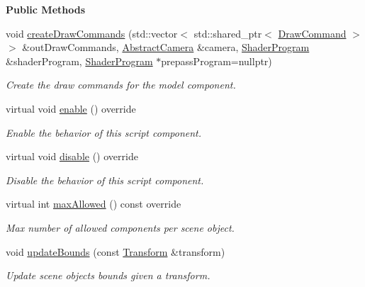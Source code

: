 \begin{Indent}\textbf{ Public Methods}\par
\begin{DoxyCompactItemize}
\item 
void \mbox{\hyperlink{classrev_1_1_model_component_a1c38827ab73085f914690da1334431c4}{create\+Draw\+Commands}} (std\+::vector$<$ std\+::shared\+\_\+ptr$<$ \mbox{\hyperlink{classrev_1_1_draw_command}{Draw\+Command}} $>$$>$ \&out\+Draw\+Commands, \mbox{\hyperlink{classrev_1_1_abstract_camera}{Abstract\+Camera}} \&camera, \mbox{\hyperlink{classrev_1_1_shader_program}{Shader\+Program}} \&shader\+Program, \mbox{\hyperlink{classrev_1_1_shader_program}{Shader\+Program}} $\ast$prepass\+Program=nullptr)
\begin{DoxyCompactList}\small\item\em Create the draw commands for the model component. \end{DoxyCompactList}\item 
\mbox{\label{classrev_1_1_model_component_a6303763c396b0edafbe86b95e893e41c}} 
virtual void \mbox{\hyperlink{classrev_1_1_model_component_a6303763c396b0edafbe86b95e893e41c}{enable}} () override
\begin{DoxyCompactList}\small\item\em Enable the behavior of this script component. \end{DoxyCompactList}\item 
\mbox{\label{classrev_1_1_model_component_abf2c5115c3d4df25e65388e788394a15}} 
virtual void \mbox{\hyperlink{classrev_1_1_model_component_abf2c5115c3d4df25e65388e788394a15}{disable}} () override
\begin{DoxyCompactList}\small\item\em Disable the behavior of this script component. \end{DoxyCompactList}\item 
\mbox{\label{classrev_1_1_model_component_a9c1b2295e5a05104cd249ee53ccfa700}} 
virtual int \mbox{\hyperlink{classrev_1_1_model_component_a9c1b2295e5a05104cd249ee53ccfa700}{max\+Allowed}} () const override
\begin{DoxyCompactList}\small\item\em Max number of allowed components per scene object. \end{DoxyCompactList}\item 
\mbox{\label{classrev_1_1_model_component_a8b9715747f2346361ec0a75f3d821b30}} 
void \mbox{\hyperlink{classrev_1_1_model_component_a8b9715747f2346361ec0a75f3d821b30}{update\+Bounds}} (const \mbox{\hyperlink{classrev_1_1_transform}{Transform}} \&transform)
\begin{DoxyCompactList}\small\item\em Update scene object\textquotesingle{}s bounds given a transform. \end{DoxyCompactList}\end{DoxyCompactItemize}
\end{Indent}
